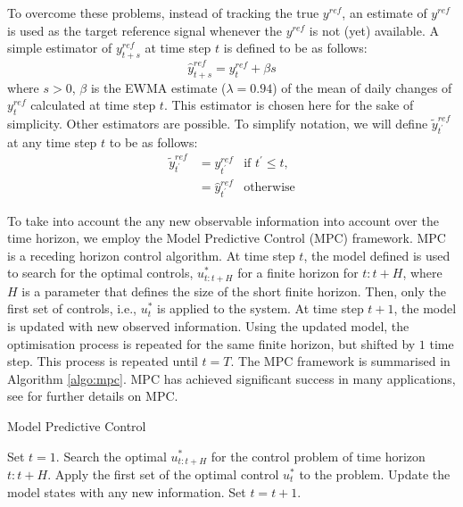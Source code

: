 To overcome these problems, instead of tracking the true $y^{ref}$, an estimate of $y^{ref}$ is used as the target reference signal whenever the $y^{ref}$ is not (yet) available. A simple estimator of $y^{ref}_{t+s}$ at time step $t$ is defined to be as follows:
\begin{equation}
  \hat{y}^{ref}_{t+s} = y^{ref}_{t} + \beta s
\end{equation}
where $s > 0$, $\beta$ is the EWMA estimate ($\lambda = 0.94$) of the mean of daily changes of $y^{ref}_t$ calculated at time step $t$. This estimator is chosen here for the sake of simplicity. Other estimators are possible. To simplify notation, we will define $\tilde{y}^{ref}_{t^\prime}$ at any time step $t$ to be as follows:
\begin{align}
\tilde{y}^{ref}_{t^\prime} &= y^{ref}_{t^\prime}&\text{if } t^\prime \leq t, \nonumber \\
                                      &= \hat{y}^{ref}_{t^\prime}&\text{otherwise}    
\end{align}

To take into account the any new observable information into account over the time horizon, we employ the Model Predictive Control (MPC) framework. MPC is a receding horizon control algorithm. At time step $t$, the model defined is used to search for the optimal controls, $u^*_{t:t+H}$ for a finite horizon for $t:t+H$, where $H$ is a parameter that defines the size of the short finite horizon. Then, only the first set of controls, i.e., $u^*_{t}$ is applied to the system. At time step $t+1$, the model is updated with new observed information. Using the updated model, the optimisation process is repeated for the same finite horizon, but shifted by $1$ time step. This process is repeated until $t=T$. The MPC framework is summarised in Algorithm \ref{algo:mpc}.  MPC has achieved significant success in many applications, see \cite{RJB09,MJM02} for further details on MPC.

\begin{algorithm}
\caption{Model Predictive Control}\label{algo:mpc}
\begin{algorithmic}[1]
\State Set $t = 1$.
\State Search the optimal $u^*_{t:t+H}$ for the control problem of time horizon $t:t+H$.
\State Apply the first set of the optimal control  $u^*_{t}$ to the problem.
\State Update the model states with any new information.
\State Set $t = t + 1$.
\EndWhile
\EndFunction
\end{algorithmic}
\end{algorithm}

